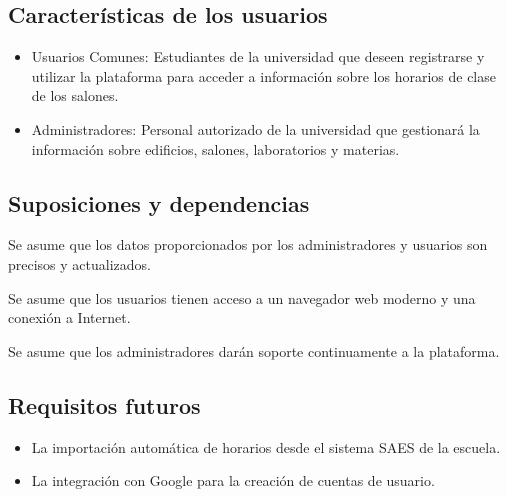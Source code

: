 \subsection{Características de los usuarios}
\begin{itemize}
        \item Usuarios Comunes: Estudiantes de la universidad que deseen registrarse y utilizar la plataforma para acceder a información sobre los horarios de clase de los salones.
        \item Administradores: Personal autorizado de la universidad que gestionará la información sobre edificios, salones, laboratorios y materias.
\end{itemize}


\subsection{Suposiciones y dependencias}
Se asume que los datos proporcionados por los administradores y usuarios son precisos y actualizados.

Se asume que los usuarios tienen acceso a un navegador web moderno y una conexión a Internet.

Se asume que los administradores darán soporte continuamente a la plataforma.

\subsection{Requisitos futuros}

\begin{itemize}
        \item La importación automática de horarios desde el sistema SAES de la escuela.
        \item La integración con Google para la creación de cuentas de usuario.

\end{itemize}